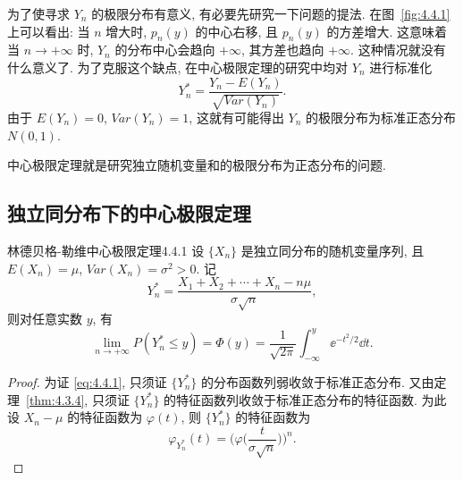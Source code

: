 为了使寻求 $ Y_n $ 的极限分布有意义, 有必要先研究一下问题的提法.
在图~\ref{fig:4.4.1} 上可以看出: 当 $ n $ 增大时, $ p_n (y) $ 的中心右移, 且 $ p_n (y) $ 的方差增大.
这意味着当 $ n \to +\infty $ 时, $ Y_n $ 的分布中心会趋向 $ +\infty $, 其方差也趋向 $ +\infty $.
这种情况就没有什么意义了.
为了克服这个缺点, 在中心极限定理的研究中均对 $ Y_n $ 进行标准化
\begin{equation*}
    Y_n^* = \frac{Y_n - E (Y_n)}{\sqrt{Var ( Y_n )}}.
\end{equation*}
由于 $ E (Y_n) = 0 $, $ Var (Y_n) = 1 $, 这就有可能得出 $ Y_n $ 的极限分布为标准正态分布 $ N (0, 1) $.

中心极限定理就是研究独立随机变量和的极限分布为正态分布的问题.

\subsection{独立同分布下的中心极限定理}

\begin{theorem}{林德贝格-勒维中心极限定理}{4.4.1}
    设 $ \{ X_n \} $ 是独立同分布的随机变量序列, 且 $ E (X_n) = \mu $, $ Var (X_n)= \sigma^2 > 0 $.
    记
    \begin{equation*}
        Y_n^* = \frac{X_1 + X_2 + \dotsb + X_n - n \mu}{\sigma \sqrt{n}},
    \end{equation*}
    则对任意实数 $ y $, 有
    \begin{equation}\label{eq:4.4.1}
        \lim_{n \to +\infty} P ( Y_n ^* \leq y ) = \Phi (y) = \frac{1}{\sqrt{2\pi}} \int_{-\infty}^y \ee^{-t^2/2} \dd t.
    \end{equation}
\end{theorem}

\begin{proof}
    为证 \eqref{eq:4.4.1}, 只须证 $ \{ Y_n^* \} $ 的分布函数列弱收敛于标准正态分布.
    又由定理~\ref{thm:4.3.4}, 只须证 $ \{ Y_n^* \} $ 的特征函数列收敛于标准正态分布的特征函数.
    为此设 $ X_n - \mu $ 的特征函数为 $ \varphi (t) $, 则 $ \{ Y_n^* \} $ 的特征函数为
    \begin{equation*}
        \varphi_{Y_n^*} (t) = \Biggl( \varphi \biggl( \frac{t}{\sigma \sqrt{n}} \biggr) \Biggr)^n.
    \end{equation*}
\end{proof}

